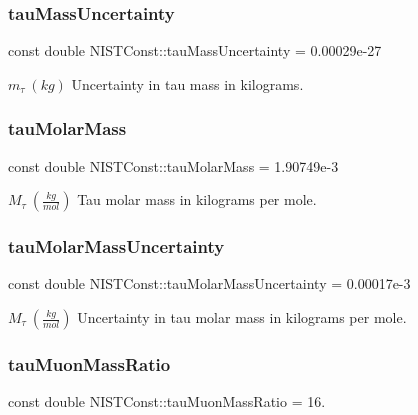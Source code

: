 \subsubsection{\texorpdfstring{tau\+Mass\+Uncertainty}{tauMassUncertainty}}
{\footnotesize\ttfamily const double N\+I\+S\+T\+Const\+::tau\+Mass\+Uncertainty = 0.\+00029e-\/27}

$m_\tau \ (kg)$ Uncertainty in tau mass in kilograms. \mbox{\label{group___n_i_s_t_const-_tau_ga07e317845454c4534cc0273efa2e55c6}} 
\subsubsection{\texorpdfstring{tau\+Molar\+Mass}{tauMolarMass}}
{\footnotesize\ttfamily const double N\+I\+S\+T\+Const\+::tau\+Molar\+Mass = 1.\+90749e-\/3}

$M_\tau \ (\frac{kg}{mol})$ Tau molar mass in kilograms per mole. \mbox{\label{group___n_i_s_t_const-_tau_ga8c1b32660badce1280d13a252cae4141}} 
\subsubsection{\texorpdfstring{tau\+Molar\+Mass\+Uncertainty}{tauMolarMassUncertainty}}
{\footnotesize\ttfamily const double N\+I\+S\+T\+Const\+::tau\+Molar\+Mass\+Uncertainty = 0.\+00017e-\/3}

$M_\tau \ (\frac{kg}{mol})$ Uncertainty in tau molar mass in kilograms per mole. \mbox{\label{group___n_i_s_t_const-_tau_gac648100c94ae427f98a87390a9263379}} 
\subsubsection{\texorpdfstring{tau\+Muon\+Mass\+Ratio}{tauMuonMassRatio}}
{\footnotesize\ttfamily const double N\+I\+S\+T\+Const\+::tau\+Muon\+Mass\+Ratio = 16.}


